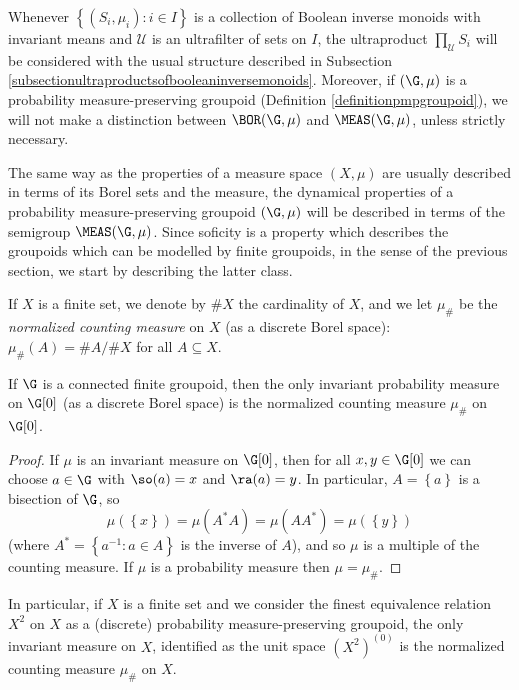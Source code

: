 Whenever $\left\{(S_i,\mu_i):i\in I\right\}$ is a collection of Boolean inverse monoids with invariant means and $\mathcal{U}$ is an ultrafilter of sets on $I$, the ultraproduct $\prod_\mathcal{U} S_i$ will be considered with the usual structure described in Subsection \ref{subsectionultraproductsofbooleaninversemonoids}. Moreover, if $(\G,\mu)$ is a probability measure-preserving groupoid (Definition \ref{definitionpmpgroupoid}), we will not make a distinction between $\BOR(\G,\mu)$ and $\MEAS(\G,\mu)$, unless strictly necessary.

The same way as the properties of a measure space $(X,\mu)$ are usually described in terms of its Borel sets and the measure, the dynamical properties of a probability measure-preserving groupoid $(\G,\mu)$ will be described in terms of the semigroup $\MEAS(\G,\mu)$. Since soficity is a property which describes the groupoids which can be modelled by finite groupoids, in the sense of the previous section, we start by describing the latter class.

\begin{definition}\label{definitionnormalizedcountingmeasure}
If $X$ is a finite set, we denote by $\# X$ the cardinality of $X$, and we let $\mu_\#$ be the \emph{normalized counting measure} on $X$ (as a discrete Borel space): $\mu_\#(A)=\#A/\#X$ for all $A\subseteq X$.
\end{definition}

\begin{proposition}
If $\G$ is a connected finite groupoid, then the only invariant probability measure on $\G[0]$ (as a discrete Borel space) is the normalized counting measure $\mu_\#$ on $\G[0]$.
\end{proposition}
\begin{proof}
If $\mu$ is an invariant measure on $\G[0]$, then for all $x,y\in\G[0]$ we can choose $a\in\G$ with $\so(a)=x$ and $\ra(a)=y$. In particular, $A=\left\{a\right\}$ is a bisection of $\G$, so
\[\mu(\left\{x\right\})=\mu(A^*A)=\mu(AA^*)=\mu(\left\{y\right\})\]
(where $A^*=\left\{a^{-1}:a\in A\right\}$ is the inverse of $A$), and so $\mu$ is a multiple of the counting measure. If $\mu$ is a probability measure then $\mu=\mu_\#$.\qedhere
\end{proof}

In particular, if $X$ is a finite set and we consider the finest equivalence relation $X^2$ on $X$ as a (discrete) probability measure-preserving groupoid, the only invariant measure on $X$, identified as the unit space $(X^2)^{(0)}$ is the normalized counting measure $\mu_\#$ on $X$.

